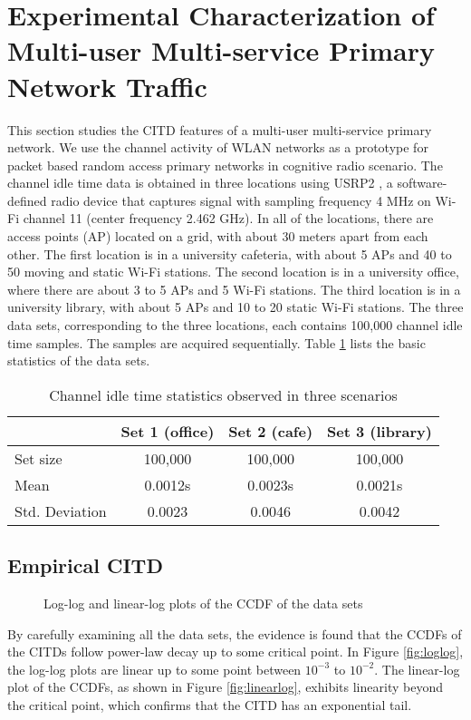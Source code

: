 \documentclass[10pt,final,journal,letterpaper]{IEEEtran}
\begin{document}
\section{Experimental Characterization of Multi-user Multi-service Primary Network Traffic}\label{sec:2}
This section studies the CITD features of a multi-user multi-service primary network. We use the channel activity of WLAN networks as a prototype for packet based random access primary networks in cognitive radio scenario. The channel idle time data is obtained in three locations using USRP2 \cite{kershaw2007kismet}, a software-defined radio device that captures signal with sampling frequency 4 MHz on Wi-Fi channel 11 (center frequency 2.462 GHz). In all of the locations, there are access points (AP) located on a grid, with about 30 meters apart from each other. The first location is in a university cafeteria, with about 5 APs and 40 to 50 moving and static Wi-Fi stations. The second location is in a university office, where there are about 3 to 5 APs and 5 Wi-Fi stations. The third location is in a university library, with about 5 APs and 10 to 20 static Wi-Fi stations. The three data sets, corresponding to the three locations, each contains 100,000 channel idle time samples. The samples are acquired sequentially. Table \ref{tb:dataset1} lists the basic statistics of the data sets.
\begin{table}[!t]
\centering
\caption{Channel idle time statistics observed in three scenarios}
  \begin{tabular}{ l || c | c | c   }
    \hline
     & Set 1 (office) & Set 2 (cafe) & Set 3 (library) \\ \hline \hline
    Set size & 100,000 & 100,000 & 100,000 \\ \hline
    Mean & 0.0012s & 0.0023s & 0.0021s \\ \hline
    Std. Deviation & 0.0023 & 0.0046 & 0.0042 \\
    \hline
  \end{tabular}\label{tb:dataset1}
\end{table}

\subsection{Empirical CITD}
\begin{figure*}[!t]
  \centering
  \caption{Log-log and linear-log plots of the CCDF of the data sets}
  \label{fig:logloglinearlog}
\end{figure*}
By carefully examining all the data sets, the evidence is found that the CCDFs of the CITDs follow power-law decay up to some critical point. In Figure \ref{fig:loglog}, the log-log plots are linear up to some point between $10^{-3}$ to $10^{-2}$. The linear-log plot of the CCDFs, as shown in Figure \ref{fig:linearlog}, exhibits linearity beyond the critical point, which confirms that the CITD has an exponential tail.
\end{document}
